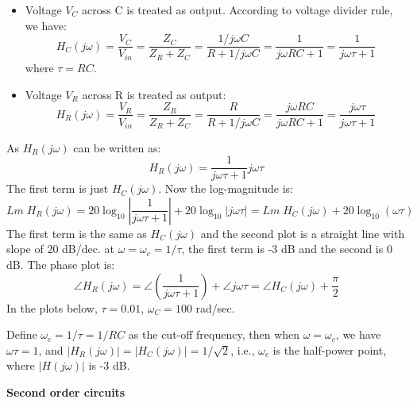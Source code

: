 \documentclass{article}
\begin{document}
\begin{itemize}
\item Voltage $V_C$ across C is treated as output. According to voltage
  divider rule, we have:
  \begin{equation} 
    H_C(j\omega)=\frac{V_C}{V_{in}}=\frac{Z_C}{Z_R+Z_C}
    =\frac{1/j\omega C}{R+1/j\omega C} 
    =\frac{1}{j\omega RC+1}=\frac{1}{j\omega \tau+1} 
  \end{equation}
  where $\tau=RC$.
\item Voltage $V_R$ across R is treated as output:
  \begin{equation}
    H_R(j\omega)=\frac{V_R}{V_{in}}=\frac{Z_R}{Z_R+Z_C}
    =\frac{R}{R+1/j\omega C}=\frac{j\omega RC}{j\omega RC+1} 
    =\frac{j\omega \tau}{j\omega \tau+1} 
  \end{equation}
\end{itemize}
As $H_R(j\omega)$ can be written as:
\begin{equation} 
  H_R(j\omega)= \frac{1}{j\omega \tau+1} j\omega \tau  
\end{equation}
The first term is just $H_C(j\omega)$. Now the log-magnitude is:
\begin{equation} 
  Lm\;H_R(j\omega)
  =20\log_{10} \left| \frac{1}{j\omega \tau+1}\right|+20\log_{10} \left| j\omega \tau \right| 
  =Lm\; H_C(j\omega) +20\log_{10} (\omega\tau) 
\end{equation}
The first term is the same as $H_C(j\omega)$ and the second plot is a straight line
with slope of 20 dB/dec. at $\omega=\omega_c=1/\tau$, the first term is -3 dB and the  
second is 0 dB.  The phase plot is:
\begin{equation} 
  \angle H_R(j\omega)=\angle \left(\frac{1}{j\omega \tau+1}\right)+\angle j\omega \tau  
  =\angle H_C(j\omega)+\frac{\pi}{2} 
\end{equation}
In the plots below, $\tau=0.01$, $\omega_C=100$ rad/sec.


Define $\omega_c=1/\tau=1/RC$ as the cut-off frequency, then when $\omega=\omega_c$, 
we have $\omega\tau=1$, and $|H_R(j\omega)|=|H_C(j\omega)|=1/\sqrt{2}$, i.e., $\omega_c$
is the half-power point, where $|H(j\omega)|$ is -3 dB.

{\bf Second order circuits}

\end{document}
